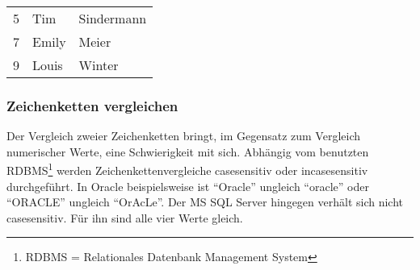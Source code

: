           \begin{center}
            \begin{small}
              \tablehead{}
              \begin{msoraclesql}
                \begin{supertabular}{rll}
                5 & Tim & Sindermann \\
                7 & Emily & Meier \\
                9 & Louis & Winter \\
                \end{supertabular}
              \end{msoraclesql}
            \end{small}
          \end{center}
\clearpage
        \subsubsection{Zeichenketten vergleichen}
          \label{stringdiff}
          Der Vergleich zweier Zeichenketten bringt, im Gegensatz zum Vergleich numerischer Werte, eine Schwierigkeit mit sich. Abhängig vom benutzten RDBMS\footnote{RDBMS = Relationales Datenbank Management System} werden Zeichenkettenvergleiche casesensitiv oder incasesensitiv durchgeführt. In Oracle beispielsweise ist \enquote{Oracle} ungleich \enquote{oracle} oder \enquote{ORACLE} ungleich \enquote{OrAcLe}. Der MS SQL Server hingegen verhält sich nicht casesensitiv. Für ihn sind alle vier Werte gleich.

